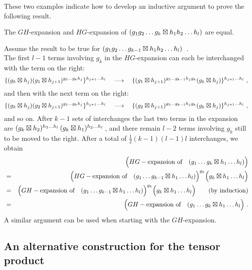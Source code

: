 \noindent
These two examples indicate how to develop an inductive argument
to prove the following result.

\begin{prop}\label{prop:GHeqHG}
The $GH$-expansion and $HG$-expansion of
$(g_1 g_2 \ldots g_k \boxtimes h_1 h_2 \ldots h_{l})$
are equal.
\end{prop}
\begin{pf}
Assume the result to be true for
$(g_1 g_2 \ldots g_{k-1} \boxtimes h_1 h_2 \ldots h_{l})$~.\\
The first $l-1$ terms involving  $g_k$  in the $HG$-expansion
can each be interchanged with the term on the right:
$$
\{(g_{k}\boxtimes h_{j}) (g_1 \boxtimes h_{j+1})^{g_2 \ldots g_{k}h_{j}}\}
  ^{h_{j+1} \ldots h_{l}}
\quad \longrightarrow \quad
\{(g_1 \boxtimes h_{j+1})^{g_2 \ldots g_{k-1}h_{j}g_{k}} (g_{k}\boxtimes h_{j})\}
  ^{h_{j+1} \ldots h_{l}}~,
$$
and then with the next term on the right:
$$
\{(g_{k}\boxtimes h_{j}) (g_2 \boxtimes h_{j+1})^{g_3 \ldots g_{k}h_{j}}\}
  ^{h_{j+1} \ldots h_{l}}
\quad \longrightarrow \quad
\{(g_2 \boxtimes h_{j+1})^{g_3 \ldots g_{k-1}h_{j}g_{k}} (g_{k}\boxtimes h_{j})\}
  ^{h_{j+1} \ldots h_{l}}~,
$$
and so on.
After $k-1$ sets of interchanges the last two terms in the expansion are
$(g_k \boxtimes h_2)^{h_3 \ldots h_{l}}\,(g_k \boxtimes h_1)^{h_2 \ldots h_{l}}\,$,
and there remain  $l-2$  terms involving  $g_k$  
still to be moved to the right.
After a total of  $\frac{1}{2}(k-1)(l-1)l$  interchanges, we obtain
\begin{eqnarray*}
   &   &  \Big(HG-\mbox{expansion of} 
            \quad(g_1 \ldots g_{k}\boxtimes h_1 \ldots h_{l})\Big) \\
   & = &  \Big(HG-\mbox{expansion of} 
            \quad(g_1 \ldots g_{k-1}\boxtimes h_1 \ldots 
           h_{l})\Big)^{g_{k}}\Big(g_{k}\boxtimes h_1 \ldots h_{l}\Big) \\
   & = &  \Big(GH-\mbox{expansion of} 
            \quad(g_1 \ldots g_{k-1}\boxtimes h_1 \ldots 
           h_{l})\Big)^{g_{k}}\Big(g_{k}\boxtimes h_1 \ldots h_{l}\Big) 
             \qquad \mbox{(by induction)} \\
   & = &  \Big(GH-\mbox{expansion of} 
            \quad(g_1 \ldots g_{k}\boxtimes h_1 \ldots h_{l}\Big) ~.
\end{eqnarray*}
A similar argument can be used when starting with the $GH$-expansion.
\end{pf}



\subsection{An alternative construction for the tensor product}

